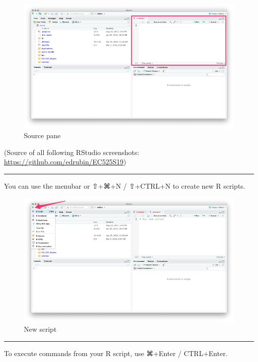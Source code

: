 \documentclass[]{book}
\begin{document}
\begin{figure}
\centering
\includegraphics{img/rstudio_source_rec.png}
\caption{Source pane}
\end{figure}

(Source of all following RStudio screenshots: \url{https://github.com/edrubin/EC525S19})

\begin{center}\rule{0.5\linewidth}{\linethickness}\end{center}

You can use the menubar or ⇧+⌘+N / ⇧+CTRL+N to create new R scripts.

\begin{figure}
\centering
\includegraphics{img/rstudio_source_arrow.png}
\caption{New script}
\end{figure}

\begin{center}\rule{0.5\linewidth}{\linethickness}\end{center}

To execute commands from your R script, use ⌘+Enter / CTRL+Enter.
\end{document}
